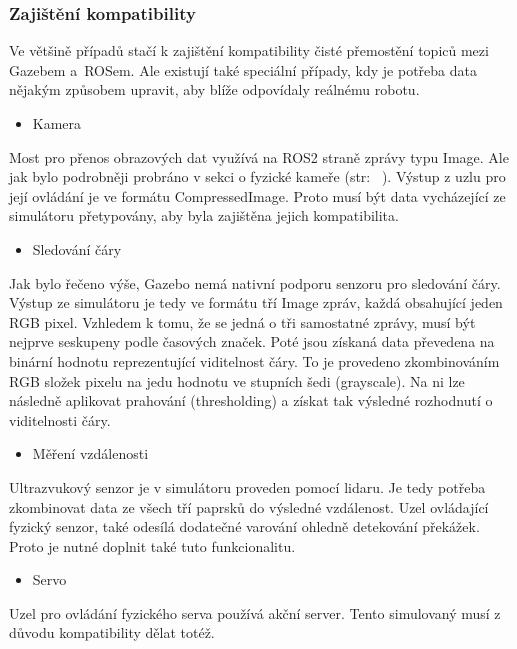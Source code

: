 \newpage
\subsubsection*{Zajištění kompatibility}
Ve většině případů stačí k zajištění kompatibility čisté přemostění topiců mezi Gazebem a~ROSem. Ale existují také speciální případy, kdy je potřeba data nějakým způsobem upravit, aby blíže odpovídaly reálnému robotu. 

\begin{itemize}[leftmargin=*]
	\item{Kamera}
\end{itemize}
\vspace*{-0.5em}
Most pro přenos obrazových dat využívá na ROS2 straně zprávy typu Image. Ale jak bylo podrobněji probráno v sekci o fyzické kameře (str:~ \pageref{implementation:camera}). Výstup z uzlu pro její ovládání je ve formátu CompressedImage. Proto musí být data vycházející ze simulátoru přetypovány, aby byla zajištěna jejich kompatibilita.

\begin{itemize}[leftmargin=*]
	\item{Sledování čáry}
\end{itemize}
\vspace*{-0.5em}
Jak bylo řečeno výše, Gazebo nemá nativní podporu senzoru pro sledování čáry. Výstup ze simulátoru je tedy ve formátu tří Image zpráv, každá obsahující jeden RGB pixel. Vzhledem k tomu, že se jedná o tři samostatné zprávy, musí být nejprve seskupeny podle časových značek. Poté jsou získaná data převedena na binární hodnotu reprezentující viditelnost čáry. To je provedeno zkombinováním RGB složek pixelu na jedu hodnotu ve stupních šedi (grayscale). Na ni lze následně aplikovat prahování (thresholding) a získat tak výsledné rozhodnutí o viditelnosti čáry.

\begin{itemize}[leftmargin=*]
	\item{Měření vzdálenosti}
\end{itemize}
\vspace*{-0.5em}
Ultrazvukový senzor je v simulátoru proveden pomocí lidaru. Je tedy potřeba zkombinovat data ze všech tří paprsků do výsledné vzdálenost. Uzel ovládající fyzický senzor, také odesílá dodatečné varování ohledně detekování překážek. Proto je nutné doplnit také tuto funkcionalitu.

\begin{itemize}[leftmargin=*]
	\item{Servo}
\end{itemize}
\vspace*{-0.5em}
Uzel pro ovládání fyzického serva používá akční server. Tento simulovaný musí z důvodu kompatibility dělat totéž.

